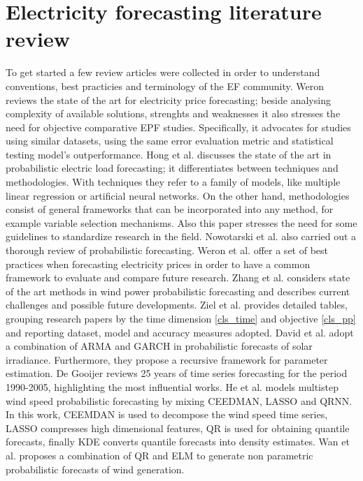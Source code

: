 \section{Electricity forecasting literature review}
To get started a few review articles were collected in order to understand conventions, best practicies and terminology of the EF community.
Weron \cite{EPF_review} reviews the state of the art for electricity price forecasting; beside analysing complexity of available solutions, strenghts and weaknesses it also stresses the need for objective comparative EPF studies. Specifically, it advocates for studies using similar datasets, using the same error evaluation metric and statistical testing model's outperformance.
Hong et al. \cite{prob_elf} discusses the state of the art in probabilistic electric load forecasting; it differentiates between techniques and methodologies. With techniques they refer to a family of models, like multiple linear regression or artificial neural networks. On the other hand, methodologies consist of general frameworks that can be incorporated into any method, for example variable selection mechanisms. Also this paper stresses the need for some guidelines to standardize research in the field.
Nowotarski et al. \cite{nowotarski} also carried out a thorough review of probabilistic forecasting.
Weron et al. \cite{lago} offer a set of best practices when forecasting electricity prices in order to have a common framework to evaluate and compare future research.
Zhang et al. \cite{zhang2014review} considers state of the art methods in wind power probabilistic forecasting and describes current challenges and possible future developments.
Ziel et al. \cite{ziel2018probabilistic} provides detailed tables, grouping research papers by the time dimension \ref{cls_time} and objective \ref{cls_pp} and reporting dataset, model and accuracy 
measures adopted.
David et al. \cite{david2016probabilistic} adopt a combination of ARMA and GARCH in probabilistic forecasts of solar irradiance. Furthermore, they propose a recursive framework for parameter estimation.
De Gooijer \cite{de200625} reviews 25 years of time series forecasting for the period 1990-2005, highlighting the most influential works.
He et al. \cite{he2022cooperative} models  multistep wind speed probabilistic forecasting by mixing CEEDMAN, LASSO and QRNN. In this work, CEEMDAN is used to decompose the wind speed time series, LASSO compresses high dimensional features, QR is used for obtaining quantile forecasts, finally KDE converts quantile forecasts into density estimates.
Wan et al. \cite{wan2016direct} proposes a combination of QR and ELM to generate non parametric probabilistic forecasts of wind generation.
